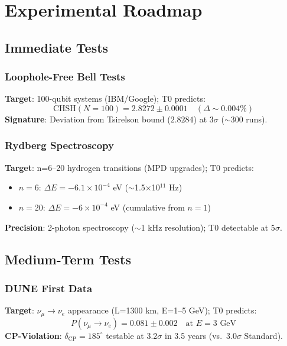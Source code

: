 	\section{Experimental Roadmap}
	
	\subsection{Immediate Tests}
	
	\subsubsection{Loophole-Free Bell Tests}
	
	\textbf{Target}: 100-qubit systems (IBM/Google); T0 predicts:
	\begin{equation}
		\text{CHSH}(N=100) = 2.8272 \pm 0.0001 \quad (\Delta \sim 0.004\%) \tag{ML-Eq.~6.1}
	\end{equation}
	\textbf{Signature}: Deviation from Tsirelson bound ($2.8284$) at $3\sigma$ ($\sim300$ runs).
	
	\subsubsection{Rydberg Spectroscopy}
	
	\textbf{Target}: n=6--20 hydrogen transitions (MPD upgrades); T0 predicts:
	\begin{itemize}
		\item $n=6$: $\Delta E = -6.1\times10^{-4}$ eV ($\sim$1.5$\times$10$^{11}$ Hz)
		\item $n=20$: $\Delta E = -6\times10^{-4}$ eV (cumulative from $n=1$)
	\end{itemize}
	\textbf{Precision}: 2-photon spectroscopy ($\sim$1 kHz resolution); T0 detectable at 5$\sigma$.
	
	\subsection{Medium-Term Tests}
	
	\subsubsection{DUNE First Data}
	
	\textbf{Target}: $\nu_\mu \to \nu_e$ appearance (L=1300 km, E=1--5 GeV); T0 predicts:
	\begin{equation}
		P(\nu_\mu \to \nu_e) = 0.081 \pm 0.002 \quad \text{at } E=3 \text{ GeV} \tag{ML-Eq.~6.2}
	\end{equation}
	\textbf{CP-Violation}: $\delta_{\text{CP}} = 185^\circ$ testable at 3.2$\sigma$ in 3.5 years (vs.~3.0$\sigma$ Standard).
	
